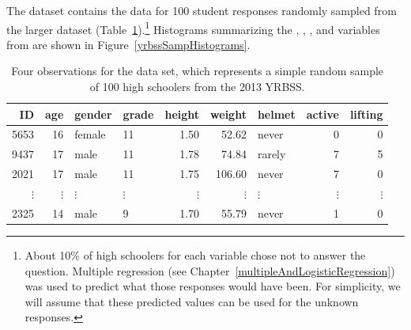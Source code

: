 \begin{spacing}{1.5}
The dataset  contains the data for 100 student responses randomly sampled from the larger  dataset (Table~\ref{yrbssSampDF}).\footnote{About 10\% of high schoolers for each variable chose not to answer the question. Multiple regression (see Chapter~\ref{multipleAndLogisticRegression}) was used to predict what those responses would have been. For simplicity, we will assume that these predicted values can be used for the unknown responses.} Histograms summarizing the , , , and  variables from  are shown in Figure~\ref{yrbssSampHistograms}.

\begin{table}
\centering
\begin{tabular}{rrllrrlrr}
  \hline
ID & age & gender & grade & height & weight & helmet & active & lifting \\ 
  \hline
5653 &  16 & female & 11 & 1.50 & 52.62 & never &   0 &   0 \\ 
  9437 &  17 & male & 11 & 1.78 & 74.84 & rarely &   7 &   5 \\ 
  2021 &  17 & male & 11 & 1.75 & 106.60 & never &   7 &   0 \\ 
  $\vdots$ & $\vdots$ & $\vdots$ & $\vdots$ & $\vdots$ & $\vdots$ & $\vdots$ & $\vdots$ & $\vdots$ \\
  2325 &  14 & male & 9 & 1.70 & 55.79 & never &   1 &   0 \\ 
   \hline
\end{tabular}
\caption{Four observations for the  data set, which represents a simple random sample of 100 high schoolers from the 2013 YRBSS.}
\label{yrbssSampDF}
\end{table}



\end{spacing}

